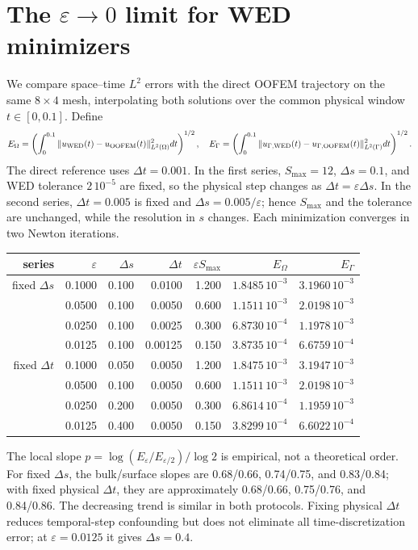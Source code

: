 \documentclass[10pt,a4paper]{article}
\begin{document}
\section{The $\varepsilon\to0$ limit for WED minimizers}
We compare space--time $L^2$ errors with the direct OOFEM trajectory on the same $8\times4$ mesh, interpolating both solutions over the common physical window $t\in[0,0.1]$. Define
\[
 E_\Omega=\left(\int_0^{0.1}\|u_{\rm WED}(t)-u_{\rm OOFEM}(t)\|^2_{L^2(\Omega)}dt\right)^{1/2},\quad
 E_\Gamma=\left(\int_0^{0.1}\|u_{\Gamma,\rm WED}(t)-u_{\Gamma,\rm OOFEM}(t)\|^2_{L^2(\Gamma)}dt\right)^{1/2}.
\]
The direct reference uses $\Delta t=0.001$. In the first series, $S_{\max}=12$, $\Delta s=0.1$, and WED tolerance $2\,10^{-5}$ are fixed, so the physical step changes as $\Delta t=\varepsilon\Delta s$. In the second series, $\Delta t=0.005$ is fixed and $\Delta s=0.005/\varepsilon$; hence $S_{\max}$ and the tolerance are unchanged, while the resolution in $s$ changes. Each minimization converges in two Newton iterations.
\begin{center}\small
\begin{tabular}{rrrrrrr}
\toprule
series&$\varepsilon$&$\Delta s$&$\Delta t$&$\varepsilon S_{\max}$&$E_\Omega$&$E_\Gamma$\\
\midrule
fixed $\Delta s$&0.1000&0.100&0.0100&1.200&$1.8485\,10^{-3}$&$3.1960\,10^{-3}$\\
&0.0500&0.100&0.0050&0.600&$1.1511\,10^{-3}$&$2.0198\,10^{-3}$\\
&0.0250&0.100&0.0025&0.300&$6.8730\,10^{-4}$&$1.1978\,10^{-3}$\\
&0.0125&0.100&0.00125&0.150&$3.8735\,10^{-4}$&$6.6759\,10^{-4}$\\
fixed $\Delta t$&0.1000&0.050&0.0050&1.200&$1.8475\,10^{-3}$&$3.1947\,10^{-3}$\\
&0.0500&0.100&0.0050&0.600&$1.1511\,10^{-3}$&$2.0198\,10^{-3}$\\
&0.0250&0.200&0.0050&0.300&$6.8614\,10^{-4}$&$1.1959\,10^{-3}$\\
&0.0125&0.400&0.0050&0.150&$3.8299\,10^{-4}$&$6.6022\,10^{-4}$\\
\bottomrule
\end{tabular}
\end{center}
The local slope $p=\log(E_\varepsilon/E_{\varepsilon/2})/\log 2$ is empirical, not a theoretical order. For fixed $\Delta s$, the bulk/surface slopes are 0.68/0.66, 0.74/0.75, and 0.83/0.84; with fixed physical $\Delta t$, they are approximately 0.68/0.66, 0.75/0.76, and 0.84/0.86. The decreasing trend is similar in both protocols. Fixing physical $\Delta t$ reduces temporal-step confounding but does not eliminate all time-discretization error; at $\varepsilon=0.0125$ it gives $\Delta s=0.4$.
\end{document}
